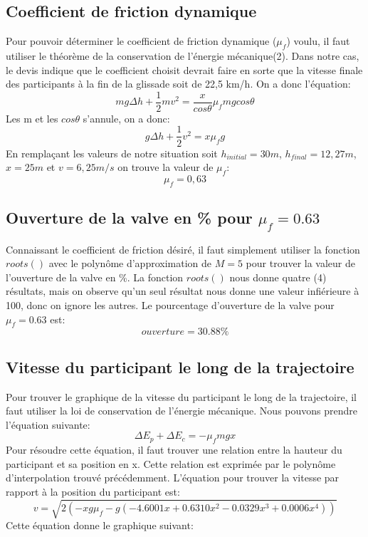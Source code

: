 \documentclass{article}
\begin{document}
\subsection{Coefficient de friction dynamique}
Pour pouvoir déterminer le coefficient de friction dynamique ($\mu_f$) voulu, il faut utiliser le théorème de la conservation de l'énergie mécanique(2). Dans notre cas, le devis indique que le coefficient choisit devrait faire en sorte que la vitesse finale des participants à la fin de la glissade soit de 22,5 km/h. On a donc l'équation:
\begin{equation}
	mg\Delta h + \frac{1}{2}mv^2 = \frac{x}{cos\theta}\mu_fmgcos\theta 
\end{equation}
Les m et les $cos\theta$ s'annule, on a donc:
\begin{equation}
	g\Delta h + \frac{1}{2}v^2 = x\mu_fg 
\end{equation}
En remplaçant les valeurs de notre situation soit $h_{initial}=30m$, $h_{final}=12,27m$, $x=25m$ et $v=6,25m/s$ on trouve la valeur de $\mu_f$:
\begin{equation}
	\mu_f = 0,63
\end{equation}

\subsection{Ouverture de la valve en \% pour $\mu_f=0.63$}
Connaissant le coefficient de friction désiré, il faut simplement utiliser la fonction $roots()$ avec le polynôme d'approximation de $M=5$ pour trouver la valeur de l'ouverture de la valve en \%. La fonction $roots()$ nous donne quatre (4) résultats, mais on observe qu'un seul résultat nous donne une valeur infiérieure à 100, donc on ignore les autres. Le pourcentage d'ouverture de la valve pour $\mu_f=0.63$ est:
\begin{equation}
	ouverture = 30.88\%
\end{equation}

\subsection{Vitesse du participant le long de la trajectoire}
Pour trouver le graphique de la vitesse du participant le long de la trajectoire, il faut utiliser la loi de conservation de l'énergie mécanique. Nous pouvons prendre l'équation suivante:
\begin{equation}
	\Delta E_p + \Delta E_c = -\mu_fmgx
\end{equation}
Pour résoudre cette équation, il faut trouver une relation entre la hauteur du participant et sa position en x. Cette relation est exprimée par le polynôme d'interpolation trouvé précédemment. L'équation pour trouver la vitesse par rapport à la position du participant est:
\begin{equation}
	v = \sqrt{2(-xg\mu_f-g(-4.6001x+0.6310x^2-0.0329x^3+0.0006x^4))}
\end{equation}
Cette équation donne le graphique suivant:
\begin{center}
\end{center}
\end{document}
